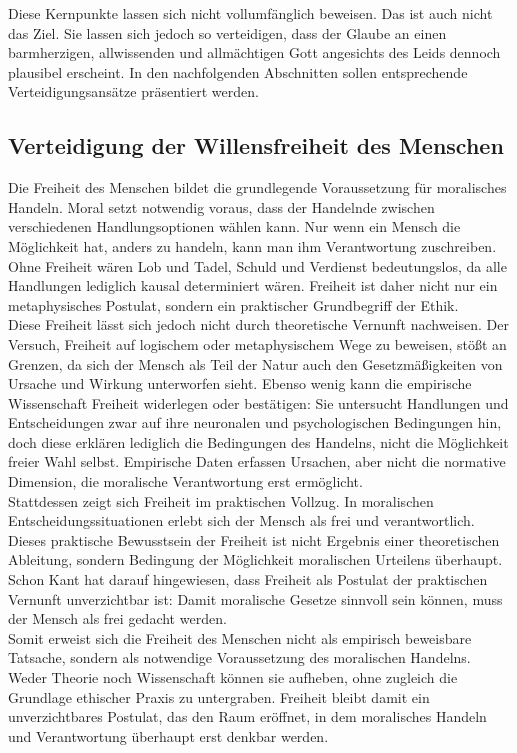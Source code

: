 Diese Kernpunkte lassen sich nicht vollumfänglich beweisen. Das ist auch nicht das Ziel. Sie lassen sich jedoch so verteidigen, dass der Glaube an einen barmherzigen, allwissenden und allmächtigen Gott angesichts des Leids dennoch plausibel erscheint. In den nachfolgenden Abschnitten sollen entsprechende Verteidigungsansätze präsentiert werden.

\subsection{Verteidigung der Willensfreiheit des Menschen} \label{Willensfreiheit}
Die Freiheit des Menschen bildet die grundlegende Voraussetzung für moralisches Handeln. Moral setzt notwendig voraus, dass der Handelnde zwischen verschiedenen Handlungsoptionen wählen kann. Nur wenn ein Mensch die Möglichkeit hat, anders zu handeln, kann man ihm Verantwortung zuschreiben. Ohne Freiheit wären Lob und Tadel, Schuld und Verdienst bedeutungslos, da alle Handlungen lediglich kausal determiniert wären. Freiheit ist daher nicht nur ein metaphysisches Postulat, sondern ein praktischer Grundbegriff der Ethik.\\

Diese Freiheit lässt sich jedoch nicht durch theoretische Vernunft nachweisen. Der Versuch, Freiheit auf logischem oder metaphysischem Wege zu beweisen, stößt an Grenzen, da sich der Mensch als Teil der Natur auch den Gesetzmäßigkeiten von Ursache und Wirkung unterworfen sieht. Ebenso wenig kann die empirische Wissenschaft Freiheit widerlegen oder bestätigen: Sie untersucht Handlungen und Entscheidungen zwar auf ihre neuronalen und psychologischen Bedingungen hin, doch diese erklären lediglich die Bedingungen des Handelns, nicht die Möglichkeit freier Wahl selbst. Empirische Daten erfassen Ursachen, aber nicht die normative Dimension, die moralische Verantwortung erst ermöglicht.\\

Stattdessen zeigt sich Freiheit im praktischen Vollzug. In moralischen Entscheidungssituationen erlebt sich der Mensch als frei und verantwortlich. Dieses praktische Bewusstsein der Freiheit ist nicht Ergebnis einer theoretischen Ableitung, sondern Bedingung der Möglichkeit moralischen Urteilens überhaupt. Schon Kant hat darauf hingewiesen, dass Freiheit als Postulat der praktischen Vernunft unverzichtbar ist: Damit moralische Gesetze sinnvoll sein können, muss der Mensch als frei gedacht werden.\\

Somit erweist sich die Freiheit des Menschen nicht als empirisch beweisbare Tatsache, sondern als notwendige Voraussetzung des moralischen Handelns. Weder Theorie noch Wissenschaft können sie aufheben, ohne zugleich die Grundlage ethischer Praxis zu untergraben. Freiheit bleibt damit ein unverzichtbares Postulat, das den Raum eröffnet, in dem moralisches Handeln und Verantwortung überhaupt erst denkbar werden.

